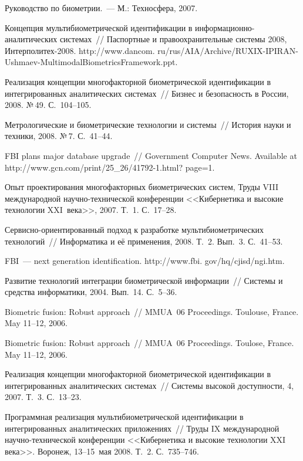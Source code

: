 \begin{multicols}{2}
{{\begin{thebibliography}{99}
Руководство по био\-мет\-рии.~--- М.: Техносфера, 2007.

Концепция муль\-ти\-био\-мет\-ри\-че\-ской идентификации в информационно-аналитических сис\-те\-мах~// 
Паспортные и правоохранительные сис\-те\-мы  2008, Интерполитех-2008. 
{\sf http://www.dancom. ru/rus/AIA/Archive/RUXIX-IPIRAN-Ushmaev-MultimodalBiometricsFramework.ppt}. 

Реализация концепции многофакторной био\-мет\-ри\-че\-ской 
идентификации в интегрированных аналитических системах~// Бизнес и безопасность в России, 2008. 
№\,49. С.~104--105.

Метрологические и биометрические технологии и 
сис\-те\-мы~// История науки и техники, 2008.  №\,7. С.~41--44.

FBI plans major database upgrade~// Government Computer News. Available at
{\sf http://www.gcn.com/print/25\_26/41792-1.html? page=1}.


Опыт проектирования многофакторных био\-мет\-ри\-че\-ских систем, 
Труды \mbox{VIII} международной научно-технической конференции <<Кибернетика и высокие 
технологии XXI~века>>, 2007. Т.~1. С.~17--28.

Сервисно-ориентированный подход к разработке муль\-ти\-био\-мет\-ри\-ческих 
технологий~// Информатика и её применения, 2008.  Т.~2. Вып.~3. С.~41--53.

FBI~--- next generation identification. {\sf http://www.fbi. gov/hq/cjisd/ngi.htm}.

Развитие технологий интеграции био\-мет\-ри\-че\-ской 
информации~// Системы и средства информатики, 2004. Вып.~14. С.~5--36.

Biometric fusion: Robust approach~// MMUA~06 Proceedings. Toulouse, France. 
May 11--12, 2006.  

Biometric fusion: Robust approach~// MMUA~06 Proceedings. Toulose, France. May 11--12, 2006.

Реализация концепции многофакторной био\-мет\-ри\-че\-ской 
идентификации в интегрированных аналитических системах~// Системы высокой доступности, 4, 
2007. Т.~3. С.~13--23.

\label{end\stat}

 Программная реализация муль\-ти\-био\-мет\-ри\-че\-ской идентификации в 
интегрированных аналитических приложениях~// Труды IX международной научно-технической 
конференции <<Кибернетика и высокие технологии XXI~ века>>. Воронеж, 13--15~мая 2008. Т.~2. 
С.~735--746.


\end{thebibliography}
}
}
\end{multicols}